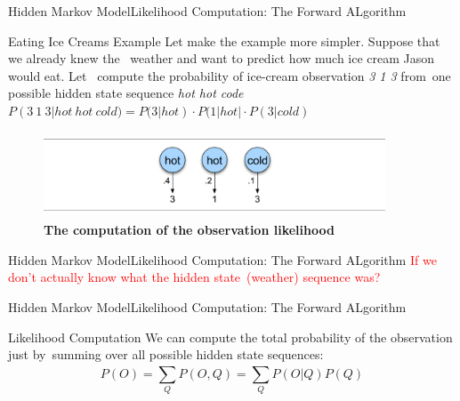 \documentclass[10pt]{beamer}
\begin{document}
\begin{frame}{Hidden Markov Model}{Likelihood Computation: The Forward ALgorithm}
   \begin{block}{Eating Ice Creams Example}
         Let make the example more simpler. Suppose that we already knew the \
         weather and want to predict how much ice cream Jason would eat. Let \
         compute the probability of ice-cream observation \textit{3 1 3} from\
         one possible hidden state sequence \textit{hot hot code}\\
         $P(3\ 1\ 3|hot\ hot\ cold) = P(3|hot) \cdot P(1|hot| \cdot P(3|cold)$
   \end{block}
  \begin{figure}[h]
    \centering
    \includegraphics[width=4in,height=1in]{figures/ice_creams_example_01.png}
    \caption {\textbf{The computation of the observation likelihood}}
  \end{figure}
\end{frame}

\begin{frame}{Hidden Markov Model}{Likelihood Computation: The Forward ALgorithm}
      \textcolor{red}{If we don't actually know what the hidden state\
                 (weather) sequence was?}
\end{frame}

\begin{frame}{Hidden Markov Model}{Likelihood Computation: The Forward ALgorithm}
   \begin{block}{Likelihood Computation}
       We can compute the total probability of the observation just by\
       summing over all possible hidden state sequences:
          \begin{equation}
            P(O) = \sum_{Q}^{}P(O, Q) = \sum_{Q}^{}P(O|Q)P(Q)
          \end{equation}
   \end{block}
\end{frame}
\end{document}
